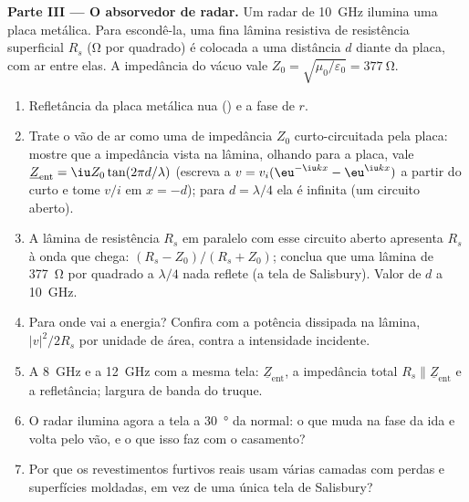 \begin{problem}
\medskip
\noindent\textbf{Parte III --- O absorvedor de radar.}
Um radar de \qty{10}{GHz} ilumina uma placa metálica. Para escondê-la, uma fina
lâmina resistiva de resistência superficial $R_s$ (\unit{\ohm} por quadrado) é
colocada a uma distância $d$ diante da placa, com ar entre elas.
A impedância do vácuo vale $Z_0 = \sqrt{\mu_0/\varepsilon_0} = \qty{377}{\ohm}$.
\begin{enumerate}[resume]
  \item Refletância da placa metálica nua () e
        a fase de $r$.
  \item Trate o vão de ar como uma  de impedância $Z_0$
        curto-circuitada pela placa: mostre que a impedância vista na
        lâmina, olhando para a placa, vale $\underline Z_{\text{ent}} = \iu Z_0
        \tan(2\pi d/\lambda)$ (escreva a  $v = v_i(\eu^{-\iu kx} -
        \eu^{\iu kx})$ a partir do curto e tome $v/i$ em $x = -d$); para $d =
        \lambda/4$ ela é infinita (um circuito aberto).
  \item A lâmina de resistência $R_s$ em paralelo com esse circuito
        aberto apresenta $R_s$ à onda que chega:  $(R_s - Z_0)/(R_s + Z_0)$; conclua que uma lâmina de
        \qty{377}{\ohm} por quadrado a $\lambda/4$ nada reflete (a
        tela de Salisbury). Valor de $d$ a \qty{10}{GHz}.
  \item Para onde vai a energia? Confira com a potência dissipada
        na lâmina, $|v|^2/2R_s$ por unidade de área, contra a intensidade
        incidente.
  \item A \qty{8}{GHz} e a \qty{12}{GHz} com a mesma tela: $\underline Z_{\text{ent}}$,
        a impedância total $R_s \parallel \underline Z_{\text{ent}}$ e a
        refletância; largura de banda do truque.
  \item O radar ilumina agora a tela a \qty{30}{\degree} da
        normal: o que muda na fase da ida e volta
        pelo vão, e o que isso faz com o casamento?
  \item Por que os revestimentos furtivos reais usam várias camadas com perdas e
        superfícies moldadas, em vez de uma única tela de Salisbury?
\end{enumerate}


\end{problem}
